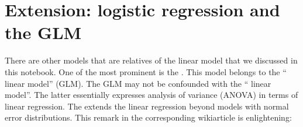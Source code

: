 \documentclass[letterpaper,10pt,english]{jupyterBook}
\begin{document}
\begin{sphinxVerbatim}[commandchars=\\\{\}]
   

         

  \PYG{p}{[} \PYG{p}{[}\PYG{p}{]} \PYG{p}{[} \PYG{p}{]}\PYGZbs{}
                                 \PYG{p}{]} \PYG{p}{[} \PYG{p}{]}   
   
 
  
\end{sphinxVerbatim}


\chapter{Extension: logistic regression and the GLM}
\label{\detokenize{Regression_Techniques:extension-logistic-regression-and-the-glm}}
\sphinxAtStartPar
There are other models that are relatives of the linear model that we discussed in this notebook. One of the most prominent is the . This model belongs to the “ linear model” (GLM). The GLM may not be confounded with the “ linear model”. The latter essentially expresses analysis of variance (ANOVA) in terms of linear regression.
The  extends the
linear regression beyond models with normal error distributions. This
remark in the corresponding wiki\sphinxhyphen{}article is enlightening:
\end{document}
